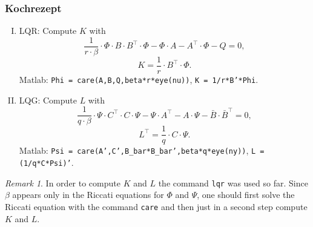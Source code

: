 \documentclass[a4paper,12 pt]{article}
\numberwithin{equation}{section}
\theoremstyle{definition}
\theoremstyle{remark}
\newtheorem*{bmk}{Remark}
\theoremstyle{definition}
\theoremstyle{definition}
\theoremstyle{definition}
\theoremstyle{remark}
\begin{document}
\subsubsection*{Kochrezept}
\begin{enumerate}[(I)]
\item LQR: Compute $K$ with
\begin{equation}
\frac{1}{r\cdot\beta}\cdot\Phi\cdot B\cdot B^\intercal\cdot \Phi-\Phi\cdot A-A^\intercal\cdot \Phi-Q=0,
\end{equation}
\begin{equation}
K=\frac{1}{r}\cdot B^\intercal\cdot \Phi.
\end{equation}
Matlab: \texttt{Phi = care(A,B,Q,beta*r*eye(nu))}, \texttt{K = 1/r*B'*Phi}.

\item LQG: Compute $L$ with
\begin{equation}
\frac{1}{q\cdot\beta}\cdot \Psi\cdot C^\intercal\cdot C\cdot \Psi-\Psi\cdot A^\intercal-A\cdot\Psi-\bar B\cdot \bar B^\intercal=0,
\end{equation}
\begin{equation}
L^\intercal=\frac{1}{q}\cdot C\cdot\Psi.
\end{equation}
Matlab: \texttt{Psi = care(A',C',B\_bar*B\_bar',beta*q*eye(ny))}, \texttt{L = (1/q*C*Psi)'}.
\end{enumerate}

\begin{bmk}
In order to compute $K$ and $L$ the command \texttt{lqr} was used so far. Since $\beta$ appears only in the Riccati equations for $\Phi$ and $\Psi$, one should first solve the Riccati equation with the command \texttt{care} and then just in a second step compute $K$ and $L$.
\end{bmk}
\end{document}
